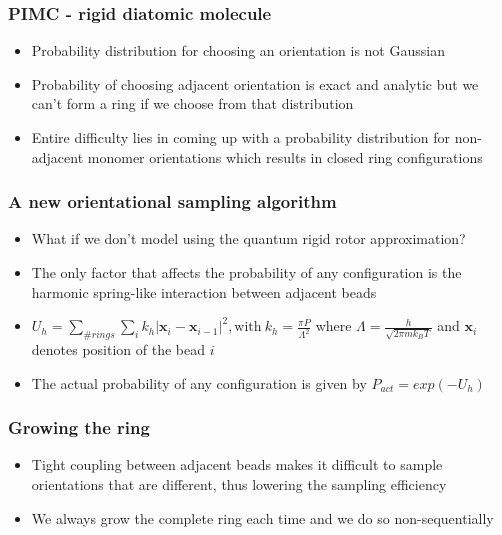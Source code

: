\documentclass[xcolor=svgnames]{beamer}
\begin{document}
	\begin{frame}
	\frametitle{PIMC - rigid diatomic molecule}
	\begin{itemize}
	\item Probability distribution for choosing an orientation is not Gaussian
	\item Probability of choosing adjacent orientation is exact and analytic but we can't form a ring if we choose from that distribution
	\begin{figure}
	\centering
	\def\svgscale{0.2}
	
	\end{figure}
	\item Entire difficulty lies in coming up with a probability distribution for non-adjacent monomer orientations which results in closed ring configurations
	\begin{figure}
	\centering
	\def\svgscale{0.3}
	
	\end{figure}
	\end{itemize}
	\end{frame}
	
	\begin{frame}
	\frametitle{A new orientational sampling algorithm}
	\begin{itemize}%
	\item What if we don't model using the quantum rigid rotor approximation? 
	\item The only factor that affects the probability of any configuration is the \alert{harmonic spring-like interaction} between adjacent beads 
	\item $U_h = \displaystyle\sum\limits_{\# rings} \displaystyle\sum\limits_i k_h |\textbf{x}_i - \textbf{x}_{i-1}|^2 ,\text{with} \: k_h = \frac{\pi P}{\Lambda^2}$ where $\Lambda = \frac{h}{\sqrt{2 \pi m k_B T}}$ \: and $\textbf{x}_i$ denotes position of the bead $i$
	\item The actual probability of any configuration is given by $P_{act} = exp(-U_h) $
	\end{itemize}
	\end{frame}

	\begin{frame}
	\frametitle{Growing the ring}
	\begin{itemize}%
	\item Tight coupling between adjacent beads makes it difficult to sample orientations that are different, thus lowering the sampling efficiency
	\item We always \alert{grow the complete ring each time} and  we do so \alert{non-sequentially}
	\end{itemize}
	\end{frame}
\end{document}
